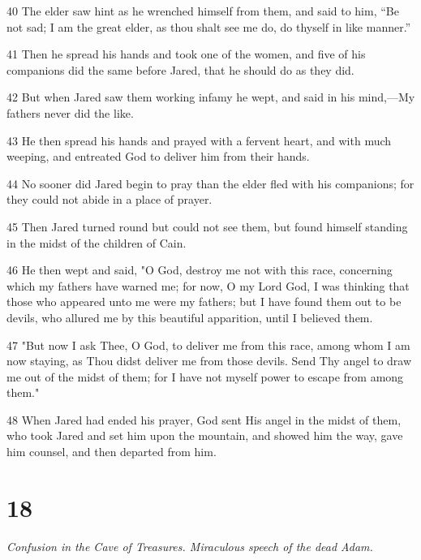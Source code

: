 \par 40 The elder saw hint as he wrenched himself from them, and said to him, “Be not sad; I am the great elder, as thou shalt see me do, do thyself in like manner.”

\par 41 Then he spread his hands and took one of the women, and five of his companions did the same before Jared, that he should do as they did.

\par 42 But when Jared saw them working infamy he wept, and said in his mind,—My fathers never did the like.

\par 43 He then spread his hands and prayed with a fervent heart, and with much weeping, and entreated God to deliver him from their hands.

\par 44 No sooner did Jared begin to pray than the elder fled with his companions; for they could not abide in a place of prayer.

\par 45 Then Jared turned round but could not see them, but found himself standing in the midst of the children of Cain.

\par 46 He then wept and said, "O God, destroy me not with this race, concerning which my fathers have warned me; for now, O my Lord God, I was thinking that those who appeared unto me were my fathers; but I have found them out to be devils, who allured me by this beautiful apparition, until I believed them.

\par 47 "But now I ask Thee, O God, to deliver me from this race, among whom I am now staying, as Thou didst deliver me from those devils. Send Thy angel to draw me out of the midst of them; for I have not myself power to escape from among them."

\par 48 When Jared had ended his prayer, God sent His angel in the midst of them, who took Jared and set him upon the mountain, and showed him the way, gave him counsel, and then departed from him.

\chapter{18}

\par \textit{Confusion in the Cave of Treasures. Miraculous speech of the dead Adam.}

